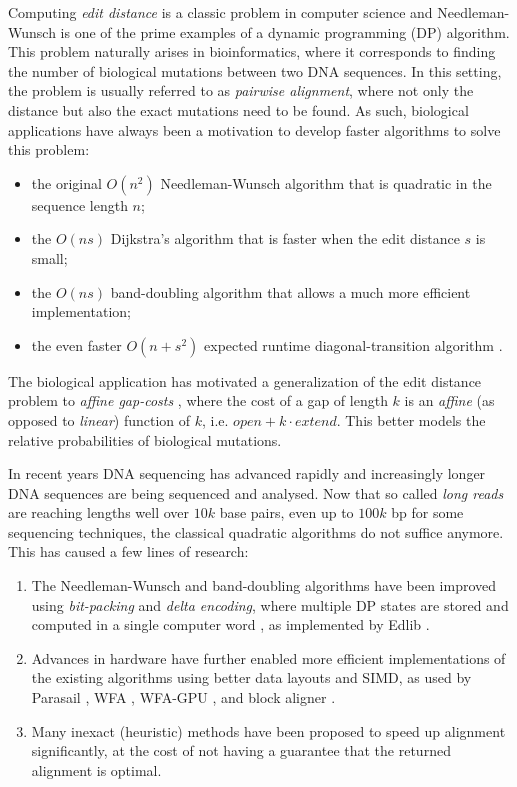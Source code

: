 \documentclass[11pt,english,a4paper]{article}
\begin{document}
Computing \emph{edit distance} is a classic problem in computer science and
Needleman-Wunsch \autocite{nw,sellers} is one of the
prime examples of a dynamic programming (DP) algorithm.
This problem naturally arises in bioinformatics, where it corresponds to finding
the number of biological mutations between two DNA sequences. In this setting,
the problem is usually referred to as \emph{pairwise alignment}, where not only the
distance but also the exact mutations need to be found. As such,
biological applications have always been a motivation to develop faster
algorithms to solve this problem:
\begin{itemize}
\item the original \(O(n^2)\) Needleman-Wunsch algorithm \autocite{nw,sellers} that is
quadratic in the sequence length \(n\);
\item the \(O(ns)\) Dijkstra's algorithm that is faster when the edit distance \(s\) is small;
\item the \(O(ns)\) band-doubling algorithm \autocite{ukkonen85} that allows a much more
efficient implementation;
\item the even faster \(O(n+s^2)\) expected runtime diagonal-transition algorithm \autocite{ukkonen85,myers86}.
\end{itemize}
The biological application has motivated a generalization of the edit distance
problem to \emph{affine gap-costs} \autocites{waterman}[][]{gotoh}[][]{wfa}, where the cost of
a gap of length \(k\) is an \emph{affine} (as opposed to \emph{linear}) function of \(k\),
i.e. \(open + k\cdot extend\).  This better models the relative probabilities of
biological mutations.

In recent years DNA sequencing has advanced rapidly and increasingly
longer DNA sequences are being sequenced and analysed. Now that so called
\emph{long reads} are reaching lengths well over \(10k\) base pairs, even up to \(100k\)
bp for some sequencing techniques, the classical quadratic algorithms do not
suffice anymore. This has caused a few lines of research:
\begin{enumerate}
\item The Needleman-Wunsch and band-doubling algorithms have been improved using
\emph{bit-packing} and \emph{delta encoding}, where multiple DP states are stored and
computed in a single computer word
\autocite{myers99,suzuki-kasahara}, as implemented by Edlib \autocite{edlib}.
\item Advances in hardware have further enabled more efficient
implementations of the existing algorithms using better data layouts and
SIMD, as used by Parasail \autocite{parasail}, WFA \autocite{wfa}, WFA-GPU
\autocite{wfa-gpu}, and block aligner \autocite{block-aligner}.
\item Many inexact (heuristic) methods have been proposed to speed up alignment
significantly, at the cost of not having a guarantee that the returned
alignment is optimal.
\end{enumerate}
\end{document}
